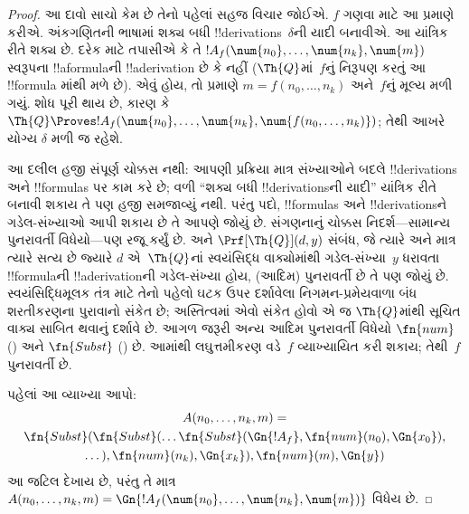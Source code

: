 \documentclass[../../../include/open-logic-section]{subfiles}
\begin{document}
\begin{proof}
આ દાવો સાચો કેમ છે તેનો પહેલાં
સહજ વિચાર જોઈએ. $f$ ગણવા માટે
આ પ્રમાણે કરીએ. અંકગણિતની
ભાષામાં શક્ય બધી
!!{derivation}s~$\delta$ની યાદી
બનાવીએ. આ યાંત્રિક રીતે શક્ય છે.
દરેક માટે તપાસીએ કે તે
$!A_f(\num{n_0}, \dots,
\num{n_k}, \num{m})$ સ્વરૂપના
!!a{formula}ની !!a{derivation}
છે કે નહીં ($\Th{Q}$માં~$f$નું
નિરૂપણ કરતું આ !!{formula}
માંથી મળે છે).
એવું હોય, તો 
પ્રમાણે $m = f(n_0, \dots, n_k)$
અને~$f$નું મૂલ્ય મળી ગયું.
શોધ પૂરી થાય છે, કારણ કે
$\Th{Q} \Proves
!A_f(\num{n_0}, \dots,
\num{n_k}, \num{f(n_0, \dots,
n_k)})$; તેથી આખરે યોગ્ય
$\delta$ મળી જ રહેશે.

આ દલીલ હજી સંપૂર્ણ ચોક્કસ નથી:
આપણી પ્રક્રિયા માત્ર સંખ્યાઓને
બદલે !!{derivation}s અને
!!{formula}s પર કામ કરે છે;
વળી ``શક્ય બધી !!{derivation}sની
યાદી'' યાંત્રિક રીતે બનાવી
શકાય તે પણ હજી સમજાવ્યું નથી.
પરંતુ પદો, !!{formula}s અને
!!{derivation}sને ગડેલ-સંખ્યાઓ
આપી શકાય છે તે આપણે જોયું છે.
સંગણનાનું ચોક્કસ નિદર્શ—સામાન્ય
પુનરાવર્તી વિધેયો—પણ રજૂ કર્યું છે.
અને $\Prf[\Th{Q}](d,y)$ સંબંધ,
જે ત્યારે અને માત્ર ત્યારે સત્ય છે
જ્યારે $d$ એ~$\Th{Q}$નાં
સ્વયંસિદ્ધ વાક્યોમાંથી ગડેલ-સંખ્યા~$y$
ધરાવતા !!{formula}ની
!!a{derivation}ની ગડેલ-સંખ્યા
હોય, (આદિમ) પુનરાવર્તી છે તે પણ
જોયું છે. સ્વયંસિદ્ધિમૂલક તંત્ર માટે તેનો પહેલો ઘટક
ઉપર દર્શાવેલા નિગમન-પ્રમેયવાળા બંધ શરતીકરણના
પુરાવાનો સંકેત છે; અસ્તિત્વમાં એવો સંકેત હોવો એ જ
$\Th{Q}$માંથી સૂચિત વાક્ય સાબિત થવાનું દર્શાવે છે.
આગળ જરૂરી અન્ય આદિમ
પુનરાવર્તી વિધેયો $\fn{num}$
()
અને $\fn{Subst}$
() છે.
આમાંથી લઘુત્તમીકરણ વડે~$f$
વ્યાખ્યાયિત કરી શકાય; તેથી~$f$
પુનરાવર્તી છે.

પહેલાં આ વ્યાખ્યા આપો:
\begin{multline*}
  A(n_0, \dots, n_k, m) = \\
  \fn{Subst}(\fn{Subst}(\dots\fn{Subst}(\Gn{!A_f}, \fn{num}(n_0), \Gn{x_0}),\\ \dots),
  \fn{num}(n_k),  \Gn{x_k}), \fn{num}(m), \Gn{y})
\end{multline*}
આ જટિલ દેખાય છે, પરંતુ તે માત્ર
$A(n_0, \dots, n_k,
m) = \Gn{!A_f(\num{n_0}, \dots,
\num{n_k}, \num{m})}$ વિધેય છે.


\end{proof}
\end{document}

